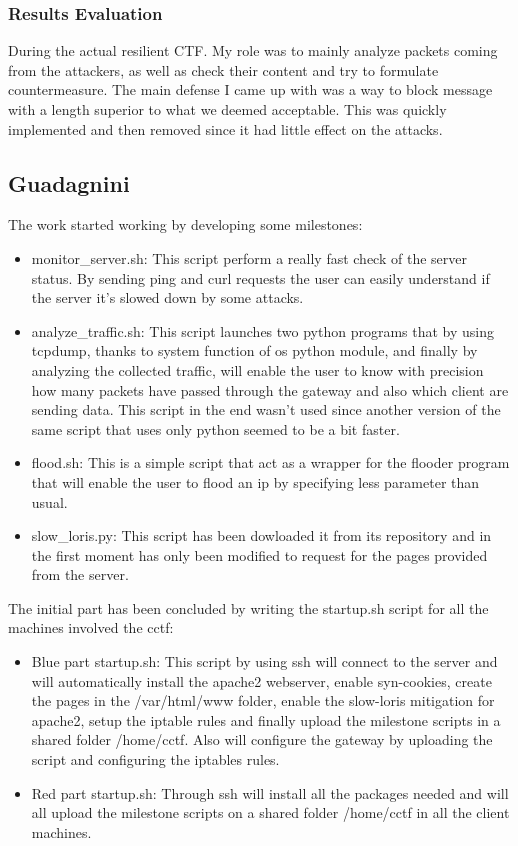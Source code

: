 \documentclass[14pt]{article}
\begin{document}
\subsubsection{Results Evaluation}
During the actual resilient CTF. My role was to mainly analyze packets coming from the attackers, as well as check their content and try to formulate countermeasure. The main defense I came up with was a way to block message with a length superior to what we deemed acceptable. This was quickly implemented and then removed since it had little effect on the attacks.

\subsection{Guadagnini}
The work started working by developing some milestones: 
\begin{itemize}
	\item monitor\_server.sh: This script perform a really fast check of the server status. By sending ping and curl requests the user can easily understand if the server it's slowed down by some attacks.
	
	\item analyze\_traffic.sh: This script launches two python programs that by using tcpdump, thanks to system function of os python module, and finally by analyzing the collected traffic, will enable the user to know with precision how many packets have passed through the gateway and also which client are sending data. This script in the end wasn't used since another version of the same script that uses only python seemed to be a bit faster.
	
	\item flood.sh: This is a simple script that act as a wrapper for the flooder program that will enable the user to flood an ip by specifying less parameter than usual.
	
	\item slow\_loris.py: This script has been dowloaded it from its repository and in the first moment has only been modified to request for the pages provided from the server.
\end{itemize}

The initial part has been concluded by writing the startup.sh script for all the machines involved the cctf:
\begin{itemize}
	\item Blue part startup.sh: This script by using ssh will connect to the server and will automatically install the apache2 webserver, enable syn-cookies, create the pages in the /var/html/www folder, enable the slow-loris mitigation for apache2, setup the iptable rules and finally upload the milestone scripts in a shared folder /home/cctf. Also will configure the gateway by uploading the script and configuring the iptables rules.
	
	\item Red part startup.sh: Through ssh will install all the packages needed and will all upload the milestone scripts on a shared folder /home/cctf in all the client machines.
\end{itemize}
\end{document}
